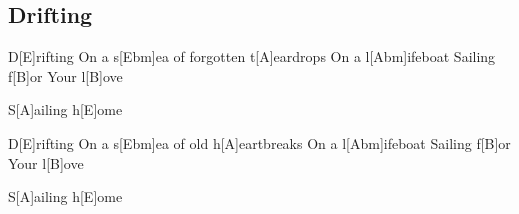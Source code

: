 \subsection*{Drifting   }
\begin{guitar}
D[E]rifting 
On a s[Ebm]ea of forgotten t[A]eardrops 
On a l[Abm]ifeboat 
Sailing f[B]or\qquad[A]{}\qquad[Dbm]{} 
Your l[B]ove\qquad[A]{}\qquad[Dbm]{}\qquad[B]{}

    

S[A]ailing h[E]ome 

           

D[E]rifting 
On a s[Ebm]ea of old h[A]eartbreaks 
On a l[Abm]ifeboat 
Sailing f[B]or\qquad[A]{}\qquad[Dbm]{} 
Your l[B]ove \qquad[A]{}\qquad[Dbm]{}\qquad[B]{}



S[A]ailing h[E]ome



\end{guitar}
